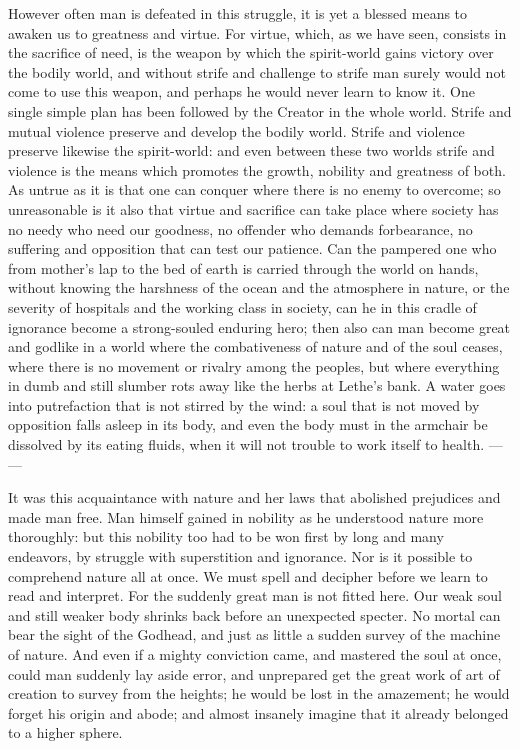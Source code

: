 \documentclass[12pt,a4paper,openany]{book}
\newcommand{\opage}[1]{\marginnote{\footnotesize\textit{[#1]}}}
\begin{document}
However often man is defeated in this struggle, it is yet a blessed means to
awaken us to greatness and virtue. For virtue, which, as we have seen, consists in
the sacrifice of need, is the weapon by which the spirit-world gains victory over
the bodily world, and without strife and challenge to strife man surely would not
come to use this weapon, and perhaps he would never learn to know it. One single
simple plan has been followed by the Creator in the whole world. Strife and mutual
violence preserve and develop the bodily world. Strife and violence preserve
likewise the spirit-world: and even between these two worlds strife and violence is
the means which promotes the growth, nobility and greatness of both. As untrue as
it is that one can conquer where there is no enemy to overcome; so unreasonable is
it also that virtue and sacrifice can take place where society has no needy who
need our goodness, no offender who demands forbearance, no suffering and
opposition that can test our patience. Can the pampered one who from mother's lap
to the bed of earth is carried through the world on hands, without knowing the
\setcounter{footnote}{0}%
\opage{44}harshness of the ocean and the atmosphere in nature, or the severity of
hospitals and the working class in society, can he in this cradle of ignorance
become a strong-souled enduring hero; then also can man become great and godlike in
a world where the combativeness of nature and of the soul ceases, where there is no
movement or rivalry among the peoples, but where everything in dumb and still
slumber rots away like the herbs at Lethe's bank. A water goes into putrefaction
that is not stirred by the wind: a soul that is not moved by opposition falls asleep
in its body, and even the body must in the armchair be dissolved by its eating
fluids, when it will not trouble to work itself to health. --- ---

It was this acquaintance with nature and her laws that abolished prejudices
and made man free. Man himself gained in nobility as he understood nature more
thoroughly: but this nobility too had to be won first by long and many endeavors,
by struggle with superstition and ignorance. Nor is it possible to comprehend nature
all at once. We must spell and decipher before we learn to read and interpret. For
the suddenly great man is not fitted here. Our weak soul and still weaker body
shrinks back before an unexpected specter. No mortal can bear the sight of the
Godhead, and just as little a sudden survey of the machine of nature. And even if a
mighty conviction came, and mastered the soul at once, could man suddenly lay aside
error, and unprepared get the great work of art of creation to survey from the
heights; he would be lost in the amazement; he would forget his origin and abode;
and almost insanely imagine that it already belonged to a higher sphere.
\end{document}
